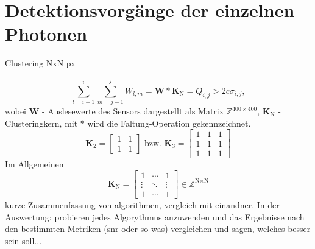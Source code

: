 \section{Detektionsvorgänge der einzelnen Photonen}
\label{text:single_photon_theorie}
Clustering NxN px \cite{cartier_micron_2014}

\begin{equation}
    \sum_{l=i-1}^{i} \sum_{m=j-1}^{j} W_{l,m} = \mathbf{W} * \mathbf{K}_{\text{N}} = Q_{i,j} > 2c\sigma_{i,j},
\end{equation}
wobei $\mathbf{W}$ - Auslesewerte des Sensors dargestellt als Matrix $\mathbb{Z}^{400\times 400}$, $\mathbf{K}_{\text{N}}$ - Clusteringkern, mit $*$ wird die Faltung-Operation gekennzeichnet.
\begin{equation}
    \mathbf{K}_{2} = \begin{bmatrix}
1 & 1\\
1 & 1
\end{bmatrix}
\text{ bzw. }
    \mathbf{K}_{3} = \begin{bmatrix}
1 & 1 & 1\\
1 & 1 & 1\\
1 & 1 & 1
\end{bmatrix}
\end{equation}
Im Allgemeinen
\begin{equation}
    \mathbf{K}_\text{N} = \begin{bmatrix}
1 & \cdots & 1\\
\vdots & \ddots & \vdots\\
1 & \cdots & 1
\end{bmatrix}
\in \mathbb{Z}^{\text{N}\times \text{N}}
\end{equation}
kurze Zusammenfassung von algorithmen, vergleich mit einandner. In der Auswertung: probieren jedes Algorythmus anzuwenden und das Ergebnisse nach den bestimmten Metriken (\gls{snr} oder so was) vergleichen und sagen, welches besser sein soll...
